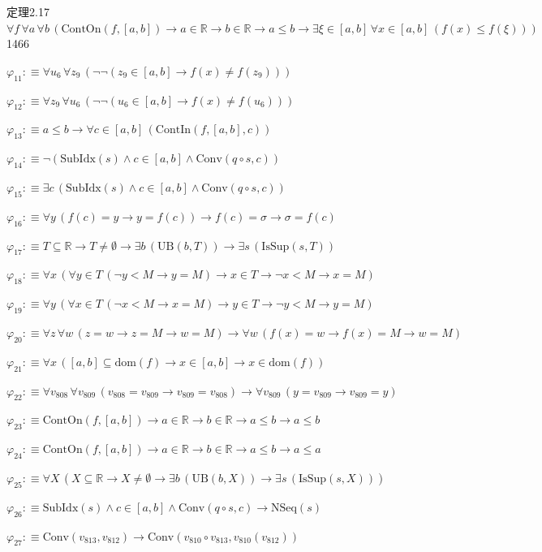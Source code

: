 \begin{fullproof}{定理2.17}{$\forall f\,\forall a\,\forall b\,(\mathrm{ContOn}(f,[a,b]) \to a \in \mathbb{R} \to b \in \mathbb{R} \to a \leq b \to \exists \xi \in [a,b]\,\forall x \in [a,b]\,(f(x) \leq f(\xi)))$}{1466}
\begin{abbrevlist}
\item $\varphi_{11} :\equiv \forall u_{6}\,\forall z_{9}\,(\neg \neg (z_{9} \in [a,b] \to f(x) \neq f(z_{9})))$
\item $\varphi_{12} :\equiv \forall z_{9}\,\forall u_{6}\,(\neg \neg (u_{6} \in [a,b] \to f(x) \neq f(u_{6})))$
\item $\varphi_{13} :\equiv a \leq b \to \forall c \in [a,b]\,(\mathrm{ContIn}(f,[a,b],c))$
\item $\varphi_{14} :\equiv \neg (\mathrm{SubIdx}(s) \land c \in [a,b] \land \mathrm{Conv}(q \circ s,c))$
\item $\varphi_{15} :\equiv \exists c\,(\mathrm{SubIdx}(s) \land c \in [a,b] \land \mathrm{Conv}(q \circ s,c))$
\item $\varphi_{16} :\equiv \forall y\,(f(c) = y \to y = f(c)) \to f(c) = \sigma \to \sigma = f(c)$
\item $\varphi_{17} :\equiv T \subseteq \mathbb{R} \to T \neq \emptyset \to \exists b\,(\mathrm{UB}(b,T)) \to \exists s\,(\mathrm{IsSup}(s,T))$
\item $\varphi_{18} :\equiv \forall x\,(\forall y \in T\,(\neg y < M \to y = M) \to x \in T \to \neg x < M \to x = M)$
\item $\varphi_{19} :\equiv \forall y\,(\forall x \in T\,(\neg x < M \to x = M) \to y \in T \to \neg y < M \to y = M)$
\item $\varphi_{20} :\equiv \forall z\,\forall w\,(z = w \to z = M \to w = M) \to \forall w\,(f(x) = w \to f(x) = M \to w = M)$
\item $\varphi_{21} :\equiv \forall x\,([a,b] \subseteq \mathrm{dom}(f) \to x \in [a,b] \to x \in \mathrm{dom}(f))$
\item $\varphi_{22} :\equiv \forall v_{808}\,\forall v_{809}\,(v_{808} = v_{809} \to v_{809} = v_{808}) \to \forall v_{809}\,(y = v_{809} \to v_{809} = y)$
\item $\varphi_{23} :\equiv \mathrm{ContOn}(f,[a,b]) \to a \in \mathbb{R} \to b \in \mathbb{R} \to a \leq b \to a \leq b$
\item $\varphi_{24} :\equiv \mathrm{ContOn}(f,[a,b]) \to a \in \mathbb{R} \to b \in \mathbb{R} \to a \leq b \to a \leq a$
\item $\varphi_{25} :\equiv \forall X\,(X \subseteq \mathbb{R} \to X \neq \emptyset \to \exists b\,(\mathrm{UB}(b,X)) \to \exists s\,(\mathrm{IsSup}(s,X)))$
\item $\varphi_{26} :\equiv \mathrm{SubIdx}(s) \land c \in [a,b] \land \mathrm{Conv}(q \circ s,c) \to \mathrm{NSeq}(s)$
\item $\varphi_{27} :\equiv \mathrm{Conv}(v_{813},v_{812}) \to \mathrm{Conv}(v_{810} \circ v_{813},v_{810}(v_{812}))$

\end{abbrevlist}
\end{fullproof}
